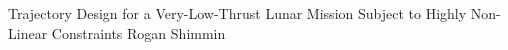 
\begin{titlepage}

  \thispagestyle{empty}\noindent
  \begin{minipage}[t]{0.5\textwidth}%
  \end{minipage}
  \begin{minipage}[t]{0.5\textwidth}%
  \end{minipage}
  \vfill

  \begin{center}
  \huge{Trajectory Design for a Very-Low-Thrust Lunar Mission Subject to Highly Non-Linear Constraints}
  \vfill\noindent
  \Large{Rogan Shimmin}
  \vfill


\end{center}
\end{titlepage}
